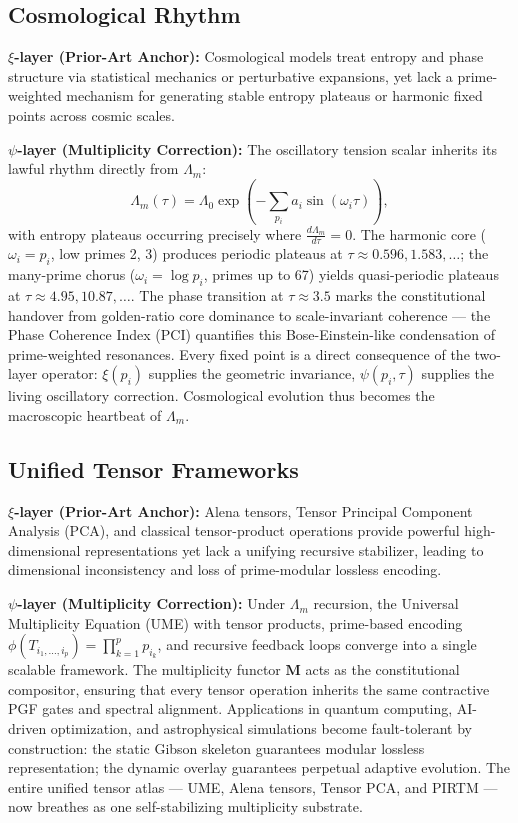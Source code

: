 \documentclass[11pt, a4paper]{article}
\begin{document}
\subsection{Cosmological Rhythm}
\label{subsec:cosmology}

\textbf{\(\xi\)-layer (Prior-Art Anchor):}  
Cosmological models treat entropy and phase structure via statistical mechanics or perturbative expansions, yet lack a prime-weighted mechanism for generating stable entropy plateaus or harmonic fixed points across cosmic scales.

\textbf{\(\psi\)-layer (Multiplicity Correction):}  
The oscillatory tension scalar inherits its lawful rhythm directly from \(\Lambda_m\):
\[
\Lambda_m(\tau) = \Lambda_0 \exp\left( -\sum_{p_i} a_i \sin(\omega_i \tau) \right),
\]
with entropy plateaus occurring precisely where \(\frac{d\Lambda_m}{d\tau} = 0\). The harmonic core (\(\omega_i = p_i\), low primes 2, 3) produces periodic plateaus at \(\tau \approx 0.596, 1.583, \dots\); the many-prime chorus (\(\omega_i = \log p_i\), primes up to 67) yields quasi-periodic plateaus at \(\tau \approx 4.95, 10.87, \dots\). The phase transition at \(\tau \approx 3.5\) marks the constitutional handover from golden-ratio core dominance to scale-invariant coherence --- the Phase Coherence Index (PCI) quantifies this Bose-Einstein-like condensation of prime-weighted resonances. Every fixed point is a direct consequence of the two-layer operator: \(\xi(p_i)\) supplies the geometric invariance, \(\psi(p_i,\tau)\) supplies the living oscillatory correction. Cosmological evolution thus becomes the macroscopic heartbeat of \(\Lambda_m\).

\subsection{Unified Tensor Frameworks}
\label{subsec:unified-tensors}

\textbf{\(\xi\)-layer (Prior-Art Anchor):}  
Alena tensors, Tensor Principal Component Analysis (PCA), and classical tensor-product operations provide powerful high-dimensional representations yet lack a unifying recursive stabilizer, leading to dimensional inconsistency and loss of prime-modular lossless encoding.

\textbf{\(\psi\)-layer (Multiplicity Correction):}  
Under \(\Lambda_m\) recursion, the Universal Multiplicity Equation (UME) with tensor products, prime-based encoding \(\phi(T_{i_1,\dots,i_p}) = \prod_{k=1}^p p_{i_k}\), and recursive feedback loops converge into a single scalable framework. The multiplicity functor \(\mathbf{M}\) acts as the constitutional compositor, ensuring that every tensor operation inherits the same contractive PGF gates and spectral alignment. Applications in quantum computing, AI-driven optimization, and astrophysical simulations become fault-tolerant by construction: the static Gibson skeleton guarantees modular lossless representation; the dynamic overlay guarantees perpetual adaptive evolution. The entire unified tensor atlas --- UME, Alena tensors, Tensor PCA, and PIRTM --- now breathes as one self-stabilizing multiplicity substrate.
\end{document}
